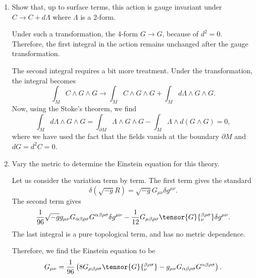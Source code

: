 \begin{enumerate}[label=\textbf{\roman*)}]
    \item Show that, up to surface terms, this action is gauge invariant under 
    $C\to C + d\Lambda$ where $\Lambda$ is a 2-form.
    \begin{solution}
    Under such a transformation, the 4-form $G \to G$, because of $d^2 = 0$. Therefore, the first integral in the action remains unchanged after the gauge transformation. 

    The second integral requires a bit more treatment. Under the transformation, the integral becomes
    \begin{equation}
        \int_M C \wedge G\wedge G \to \int_M C \wedge G\wedge G + \int_M d\Lambda \wedge G\wedge G.
    \end{equation}
    Now, using the Stoke's theorem, we find
    \begin{equation}
        \int_M d\Lambda \wedge G\wedge G = \int_{\partial M} \Lambda \wedge G\wedge G-\int_M \Lambda\wedge d(G\wedge G) = 0,
    \end{equation}
    where we have used the fact that the fields vanish at the boundary $\partial M$ and $dG = d^2C  =0$.
    \end{solution}

    \item Vary the metric to determine the Einstein equation for this theory.
    
    \begin{solution}
        Let us consider the variation term by term. The first term gives the standard
        \begin{equation}
            \delta(\sqrt{-g}R) = \sqrt{-g}G_{\mu\nu}\delta g^{\mu\nu}.
        \end{equation}
        The second term gives
        \begin{equation}
            \frac{1}{96}\sqrt{-g}g_{\mu\nu}G_{\alpha\beta\rho\sigma}G^{\alpha\beta\rho\sigma}\delta g^{\mu\nu} - \frac{1}{12}G_{\mu\beta\rho\sigma}\tensor{G}{_\nu^{\beta\rho\sigma}}\delta g^{\mu\nu}.
        \end{equation}
    The last integral is a pure topological term, and has no metric dependence.
    
    Therefore, we find the Einstein equation to be
    \begin{equation}
        G_{\mu\nu} = \frac{1}{96}\left(8G_{\mu\beta\rho\sigma}\tensor{G}{_\nu^{\beta\rho\sigma}} - g_{\mu\nu}G_{\alpha\beta\rho\sigma}G^{\alpha\beta\rho\sigma}\right).
    \end{equation}
    \end{solution}
    

\end{enumerate}
